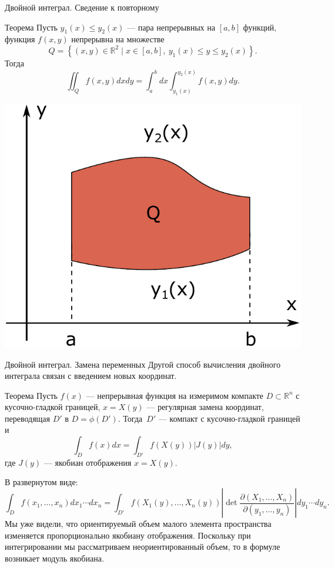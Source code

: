 \documentclass[8pt]{beamer}
\newcommand{\pp}[2]{\frac{\partial #1}{\partial #2}}
\begin{document}
\begin{frame}{Двойной интеграл. Сведение к повторному}
\begin{block}{Теорема}
Пусть $y_1(x)\le y_2(x)$ --- пара непрерывных на $[a,b]$ функций, функция $f(x,y)$ непрерывна на множестве
$$Q =\left\{ (x,y)\in\mathbb{R}^2 \mid
 x\in[a,b],\ y_1(x)\le y\le y_2(x) \right\}.$$
Тогда
$$\iint_Q f(x,y)dxdy =\int_a^b dx \int_{y_1(x)}^{y_2(x)}f(x,y)dy.$$
\end{block}
\begin{center}
\includegraphics[scale=0.4]{iintQ.pdf}
\end{center}
\end{frame}

\begin{frame}{Двойной интеграл. Замена переменных}
Другой способ вычисления двойного интеграла связан с введением новых координат.
\begin{block}{Теорема}
Пусть $f(x)$ --- непрерывная функция на измеримом компакте $D\subset\mathbb{R}^n$ с кусочно-гладкой границей,  $x = X(y)$ --- регулярная замена координат, переводящая $D'$ в $D = \phi(D')$. Тогда~$D'$ --- компакт с кусочно-гладкой границей и
$$\int_D f(x)dx= \int_{D'} f(X(y))|J(y)|dy,$$
где $J(y)$ --- якобиан отображения $x=X(y)$.
\end{block}
В развернутом виде:
$$\int_D f(x_1,\ldots, x_n)dx_1\cdots dx_n= \int_{D'} f(X_1(y),\ldots, X_n(y))\left| \det \pp{(X_1,\ldots, X_n)}{(y_1,\ldots,y_n)}\right| dy_1\cdots dy_n.$$
Мы уже видели, что ориентируемый объем малого элемента пространства изменяется пропорционально якобиану отображения. Поскольку при интегрировании мы рассматриваем неориентированный объем, то в формуле возникает модуль якобиана.
\end{frame}
\end{document}
